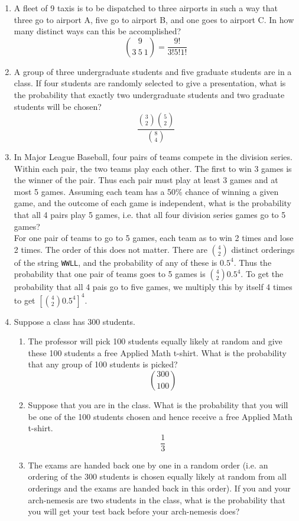\documentclass[12pt]{article}
\begin{document}
\begin{enumerate}
\item A fleet of 9 taxis is to be dispatched to three airports in such a way that three go to airport A, five go to airport B, and one goes to airport C. In how many distinct ways can this be accomplished?
\[
\binom{9}{3\:5\:1} = \frac{9!}{3!5!1!}
\]

\item A group of three undergraduate students and five graduate students are in a class. If four students are randomly selected to give a presentation, what is the probability that exactly two undergraduate students and two graduate students will be chosen?
\[
\dfrac{\binom{3}{2}\binom{5}{2}}{\binom{8}{4}}
\]

\item In Major League Baseball, four pairs of teams compete in the division series. Within each pair, the two teams play each other. The first to win 3 games is the winner of the pair. Thus each pair must play at least 3 games and at most 5 games. Assuming each team has a 50\% chance of winning a given game, and the outcome of each game is independent, what is the probability that all 4 pairs play 5 games, i.e. that all four division series games go to 5 games?\\

For one pair of teams to go to 5 games, each team as to win 2 times and lose 2 times. The order of this does not matter. There are $\binom{4}{2}$ distinct orderings of the string \texttt{WWLL}, and the probability of any of these is $0.5^4$. Thus the probability that one pair of teams goes to 5 games is $\binom{4}{2} 0.5^4$. To get the probability that all 4 pais go to five games, we multiply this by itself 4 times to get $[\binom{4}{2} 0.5^4]^4 $.

\item Suppose a class has 300 students.\\
\begin{enumerate}
\item The professor will pick 100 students equally likely at random and give these 100 students a free Applied Math t-shirt. What is the probability that any group of 100 students is picked?
\[
\binom{300}{100}
\]
\item Suppose that you are in the class. What is the probability that you will be one of the 100 students chosen and hence receive a free Applied Math t-shirt.
\[
\frac{1}{3}
\]
\item The exams are handed back one by one in a random order (i.e. an ordering of the 300 students is chosen equally likely at random from all orderings and the exams are handed back in this order). If you and your arch-nemesis are two students in the class, what is the probability that you will get your test back before your arch-nemesis does?\\


\end{enumerate}
\end{enumerate}
\end{document}
